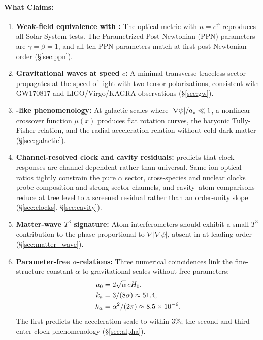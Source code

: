 \paragraph{What \DFD Claims:}
\begin{enumerate}[label=\arabic*.]
\item \textbf{Weak-field equivalence with \GR:} The optical metric with 
$n = e^\psi$ reproduces all Solar System tests. The Parametrized Post-Newtonian 
(PPN) parameters are $\gamma = \beta = 1$, and all ten PPN parameters match 
\GR at first post-Newtonian order (\S\ref{sec:ppn}).

\item \textbf{Gravitational waves at speed $c$:} A minimal transverse-traceless 
sector propagates at the speed of light with two tensor polarizations, 
consistent with GW170817 and LIGO/Virgo/KAGRA observations (\S\ref{sec:gw}).

\item \textbf{\MOND-like phenomenology:} At galactic scales where 
$|\nabla\psi|/a_\star \ll 1$, a nonlinear crossover function $\mu(x)$ produces 
flat rotation curves, the baryonic Tully-Fisher relation, and the radial 
acceleration relation without cold dark matter (\S\ref{sec:galactic}).

\item \textbf{Channel-resolved clock and cavity residuals:} \DFD predicts that clock responses are channel-dependent rather than universal. Same-ion optical ratios tightly constrain the pure $\alpha$ sector, cross-species and nuclear clocks probe composition and strong-sector channels, and cavity--atom comparisons reduce at tree level to a screened residual rather than an order-unity slope (\S\ref{sec:clocks}, \S\ref{sec:cavity}).

\item \textbf{Matter-wave $T^3$ signature:} Atom interferometers should 
exhibit a small $T^3$ contribution to the phase proportional to $\nabla|\nabla\psi|$, 
absent in \GR at leading order (\S\ref{sec:matter_wave}).

\item \textbf{Parameter-free $\alpha$-relations:} Three numerical coincidences 
link the fine-structure constant $\alpha$ to gravitational scales without 
free parameters:
\begin{align}
a_0 &= 2\sqrt{\alpha}\,cH_0, \\
k_a &= 3/(8\alpha) \approx 51.4, \\
k_\alpha &= \alpha^2/(2\pi) \approx 8.5 \times 10^{-6}.
\end{align}
The first predicts the \MOND acceleration scale to within 3\%; the second 
and third enter clock phenomenology (\S\ref{sec:alpha}).


\end{enumerate}
